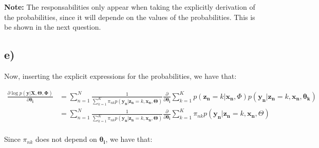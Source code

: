 \documentclass[12pt,a4paper,oneside]{paper}
\begin{document}
\textbf{Note:} The responsabilities only appear when taking the explicitly derivation of the probabilities,
since it will depende on the values of the probabilities. This is be shown in the next question.


\newpage
\subsection*{e)}

Now, inserting the explicit expressions for the probabilities, we have that:

\begin{align*}
    \frac{\partial \log p(\bm{y} | \bm{X}, \bm{\Theta}, \bm{\Phi})}{\partial \bm{\theta_i}} &= \sum_{n=1}^{N} \frac{1}{\sum_{k=1}^{K} \pi_{nk} p(\bm{y_n} | \bm{z_n} = k, \bm{x_n}, \bm{\Theta})} \frac{\partial}{\partial \bm{\theta_i}} \sum_{k=1}^{K} p(\bm{z_n} = k | \bm{x_n}, \Phi) p(\bm{y_n} | \bm{z_n} = k, \bm{x_n}, \bm{\theta_k}) \\
    &= \sum_{n=1}^{N} \frac{1}{\sum_{k=1}^{K} \pi_{nk} p(\bm{y_n} | \bm{z_n} = k, \bm{x_n}, \bm{\Theta})} \frac{\partial}{\partial \bm{\theta_i}} \sum_{k=1}^{K} \pi_{nk} p(\bm{y_n} | \bm{z_n} = k, \bm{x_n}, \Theta) \\
\end{align*}

Since $\pi_{nk}$ does not depend on $\bm{\theta_i}$, we have that:
\end{document}
